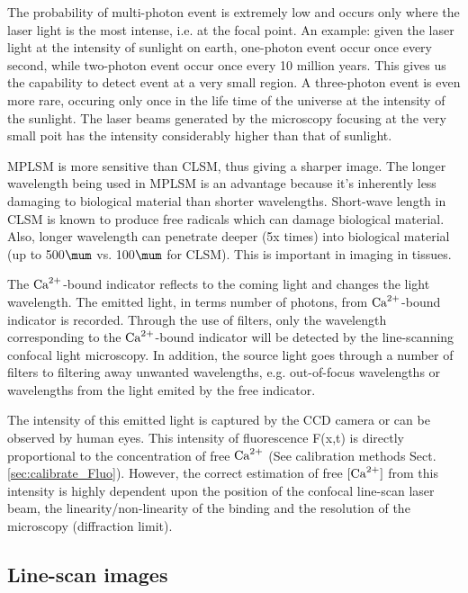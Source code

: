 \begin{framed}
The probability of multi-photon event is extremely low and occurs only where the
laser light is the most intense, i.e. at the focal point. An example: given the
laser light at the intensity of sunlight on earth, one-photon event occur once
every second, while two-photon event occur once every 10 million years. This
gives us the capability to detect event at a very small region. A three-photon
event is even more rare, occuring only once in the life time of the universe
at the intensity of the sunlight.  The laser beams generated by the microscopy
focusing at the very small poit has the intensity considerably higher than that
of sunlight. 

MPLSM is more sensitive than CLSM, thus giving a sharper image. The longer
wavelength being used in MPLSM is an advantage because it's inherently less
damaging to biological material than shorter wavelengths. Short-wave length in
CLSM is known to produce free radicals which can damage biological material. 
Also, longer wavelength can penetrate deeper (5x times) into biological material
(up to 500$\mum$ vs. 100$\mum$ for CLSM). This is important in imaging in
tissues.
\end{framed}

The ${\text{Ca}^{2+}}$-bound indicator reflects to the coming light and changes the light
wavelength. The emitted light, in terms number of photons, from ${\text{Ca}^{2+}}$-bound
indicator is recorded. Through the use of filters, only the wavelength
corresponding to the ${\text{Ca}^{2+}}$-bound indicator will be detected by the line-scanning
confocal light microscopy. In addition, the source light goes through a number
of filters to filtering away unwanted wavelengths, e.g.
out-of-focus wavelengths or wavelengths from the light emited by the free
indicator.

The intensity of this emitted light is captured by the CCD camera or can be
observed by human eyes. This intensity of fluorescence F(x,t) is directly
proportional to the concentration of free ${\text{Ca}^{2+}}$ (See calibration methods
Sect.\ref{sec:calibrate_Fluo}).
However, the correct estimation of free $[{\text{Ca}^{2+}}]$ from this intensity is highly
dependent upon the position of the confocal line-scan laser beam, the
linearity/non-linearity of the binding and the resolution of the microscopy
(diffraction limit).

\subsection{Line-scan images}

